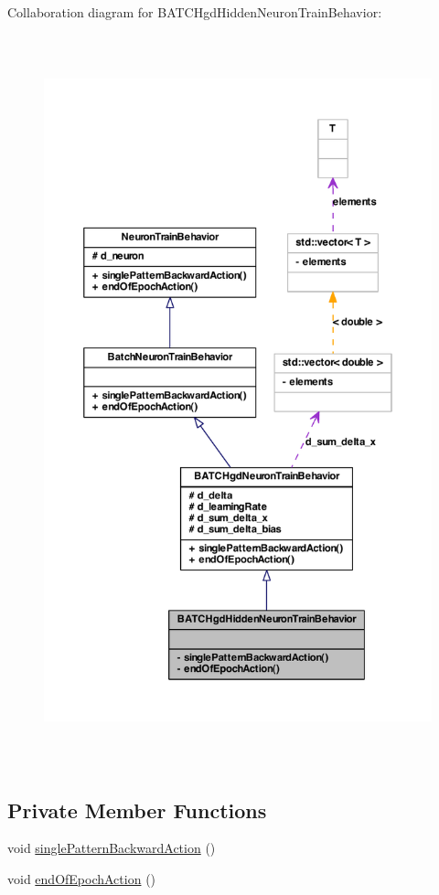 Collaboration diagram for BATCHgdHiddenNeuronTrainBehavior:
\nopagebreak
\begin{figure}[H]
\begin{center}
\leavevmode
\includegraphics[height=600pt]{class_b_a_t_c_hgd_hidden_neuron_train_behavior__coll__graph}
\end{center}
\end{figure}
\subsection*{Private Member Functions}
\begin{DoxyCompactItemize}
\item 
void \hyperlink{class_b_a_t_c_hgd_hidden_neuron_train_behavior_a68ca3b8816a87610ff07ba2745345956}{singlePatternBackwardAction} ()
\item 
void \hyperlink{class_b_a_t_c_hgd_hidden_neuron_train_behavior_a31cac1d782120cc798c7ef0492d32eed}{endOfEpochAction} ()
\end{DoxyCompactItemize}


